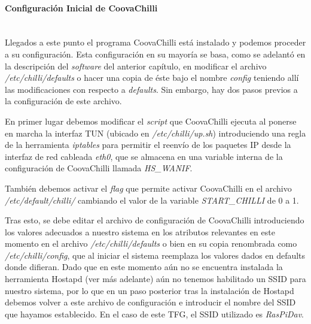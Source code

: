 \paragraph{Configuración Inicial de CoovaChilli} \label{CoovaConfig} ~\\

Llegados a este punto el programa CoovaChilli está instalado y podemos proceder a su configuración. Esta configuración en su mayoría se basa, como se adelantó en la descripción del \emph{software} del anterior capítulo, en modificar el archivo \emph{/etc/chilli/defaults} o hacer una copia de éste bajo el nombre \emph{config} teniendo allí las modificaciones con respecto a \emph{defaults}. Sin embargo, hay dos pasos previos a la configuración de este archivo.

En primer lugar debemos modificar el \emph{script} que CoovaChilli ejecuta al ponerse en marcha la interfaz TUN (ubicado en \emph{/etc/chilli/up.sh}) introduciendo una regla de la herramienta \emph{iptables} para permitir el reenvío de los paquetes IP desde la interfaz de red cableada \emph{eth0}, que se almacena en una variable interna de la configuración de CoovaChilli llamada \emph{HS\_WANIF}.


También debemos activar el \emph{flag} que permite activar CoovaChilli en el archivo \emph{/etc/default/chilli/} cambiando el valor de la variable \emph{START\_CHILLI} de 0 a 1.

Tras esto, se debe editar el archivo de configuración de CoovaChilli introduciendo los valores adecuados a nuestro sistema en los atributos relevantes en este momento en el archivo \emph{/etc/chilli/defaults} o bien en su copia renombrada como \emph{/etc/chilli/config}, que al iniciar el sistema reemplaza los valores dados en defaults donde difieran. Dado que en este momento aún no se encuentra instalada la herramienta Hostapd (ver más adelante) aún no tenemos habilitado un SSID para nuestro sistema, por lo que en un paso posterior tras la instalación de Hostapd debemos volver a este archivo de configuración e introducir el nombre del SSID que hayamos establecido. En el caso de este TFG, el SSID utilizado es \emph{RasPiDav}.

